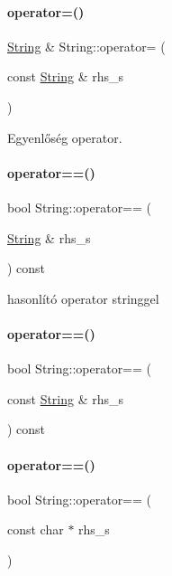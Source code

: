 \paragraph{\texorpdfstring{operator=()}{operator=()}}
{\footnotesize\ttfamily \mbox{\hyperlink{class_string}{String}} \& String\+::operator= (\begin{DoxyParamCaption}\item[{const \mbox{\hyperlink{class_string}{String}} \&}]{rhs\+\_\+s }\end{DoxyParamCaption})}



Egyenlőség operator. 

\mbox{\label{class_string_aa94d2477f4f80aad7703bf4d7a39d332}} 
\paragraph{\texorpdfstring{operator==()}{operator==()}\hspace{0.1cm}{\footnotesize\ttfamily [1/4]}}
{\footnotesize\ttfamily bool String\+::operator== (\begin{DoxyParamCaption}\item[{\mbox{\hyperlink{class_string}{String}} \&}]{rhs\+\_\+s }\end{DoxyParamCaption}) const}



hasonlító operator stringgel 

\mbox{\label{class_string_aa4f7798884d99a0e28712d4e4044d303}} 
\paragraph{\texorpdfstring{operator==()}{operator==()}\hspace{0.1cm}{\footnotesize\ttfamily [2/4]}}
{\footnotesize\ttfamily bool String\+::operator== (\begin{DoxyParamCaption}\item[{const \mbox{\hyperlink{class_string}{String}} \&}]{rhs\+\_\+s }\end{DoxyParamCaption}) const}

\mbox{\label{class_string_ade9af860a809548214837e33367e8835}} 
\paragraph{\texorpdfstring{operator==()}{operator==()}\hspace{0.1cm}{\footnotesize\ttfamily [3/4]}}
{\footnotesize\ttfamily bool String\+::operator== (\begin{DoxyParamCaption}\item[{const char $\ast$}]{rhs\+\_\+s }\end{DoxyParamCaption})}



